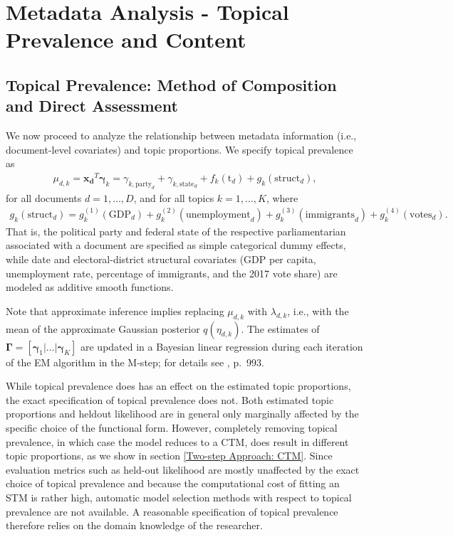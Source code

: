 \section{Metadata Analysis - Topical Prevalence and Content}
\label{Metadata Analysis - Topical Prevalence and Content}

\subsection{Topical Prevalence: Method of Composition and Direct Assessment}
\label{Covariate-level Topic Analysis}

We now proceed to analyze the relationship between metadata information (i.e., document-level covariates) and topic proportions. We specify topical prevalence as 
\begin{align}
\mu_{d,k} = \boldsymbol{x_d}^T \boldsymbol{\gamma}_k= \gamma_{k,\text{party}_d} + \gamma_{k,\text{state}_d} + f_k(\text{t}_d) + g_k(\text{struct}_d), \label{prevalence}
\end{align} 
for all documents $d = 1,\dots,D$, and for all topics $k = 1,\dots,K$, where 
\begin{align*}
g_k(\text{struct}_d) = g_{k}^{(1)}(\text{GDP}_d)+g_{k}^{(2)}(\text{unemployment}_d)+g_{k}^{(3)}(\text{immigrants}_d)+g_{k}^{(4)}(\text{votes}_d). 
\end{align*} 
That is, the political party and federal state of the respective parliamentarian associated with a document are specified as simple categorical dummy effects, while date and electoral-district structural covariates (GDP per capita, unemployment rate, percentage of immigrants, and the 2017 vote share) are modeled as additive smooth functions.

Note that approximate inference implies replacing $\mu_{d,k}$ with $\lambda_{d,k}$, i.e., with the mean of the approximate Gaussian posterior $q(\eta_{d,k})$. The estimates of $\boldsymbol{\Gamma} = [\boldsymbol{\gamma}_1 | \dots | \boldsymbol{\gamma}_K]$ are updated in a Bayesian linear regression during each iteration of the EM algorithm in the M-step; for details see \cite{roberts2013structural}, p.\ 993.

While topical prevalence does has an effect on the estimated topic proportions, the exact specification of topical prevalence does not. Both estimated topic proportions and heldout likelihood are in general only marginally affected by the specific choice of the functional form. However, completely removing topical prevalence, in which case the model reduces to a CTM, does result in different topic proportions, as we show in section \ref{Two-step Approach: CTM}. Since evaluation metrics such as held-out likelihood are mostly unaffected by the exact choice of topical prevalence and because the computational cost of fitting an STM is rather high, automatic model selection methods with respect to topical prevalence are not available. A reasonable specification of topical prevalence therefore relies on the domain knowledge of the researcher.

